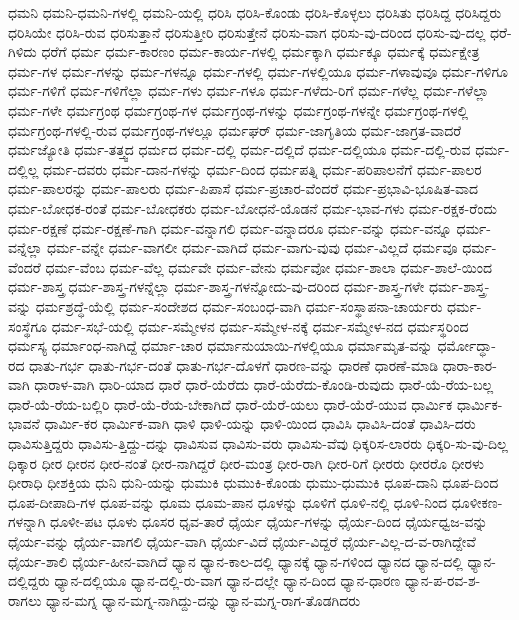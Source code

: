 {ಧಮನಿ
ಧಮನಿ-ಧಮನಿ-ಗಳಲ್ಲಿ
ಧಮನಿ-ಯಲ್ಲಿ
ಧರಿಸಿ
ಧರಿಸಿ-ಕೊಂಡು
ಧರಿಸಿ-ಕೊಳ್ಳಲು
ಧರಿಸಿತು
ಧರಿಸಿದ್ದ
ಧರಿಸಿದ್ದರು
ಧರಿಸಿಯೇ
ಧರಿಸಿ-ರುವ
ಧರಿಸುತ್ತಾನೆ
ಧರಿಸುತ್ತೀರಿ
ಧರಿಸುತ್ತೇನೆ
ಧರಿಸು-ವಾಗ
ಧರಿಸು-ವು-ದರಿಂದ
ಧರಿಸು-ವು-ದಲ್ಲ
ಧರೆ-ಗಿಳಿದು
ಧರೆಗೆ
ಧರ್ಮ
ಧರ್ಮ-ಕಾರಣಂ
ಧರ್ಮ-ಕಾರ್ಯ-ಗಳಲ್ಲಿ
ಧರ್ಮಕ್ಕಾಗಿ
ಧರ್ಮಕ್ಕೂ
ಧರ್ಮಕ್ಕೆ
ಧರ್ಮಕ್ಷೇತ್ರ
ಧರ್ಮ-ಗಳ
ಧರ್ಮ-ಗಳನ್ನು
ಧರ್ಮ-ಗಳನ್ನೂ
ಧರ್ಮ-ಗಳಲ್ಲಿ
ಧರ್ಮ-ಗಳಲ್ಲಿಯೂ
ಧರ್ಮ-ಗಳಾವುವೂ
ಧರ್ಮ-ಗಳಿಗೂ
ಧರ್ಮ-ಗಳಿಗೆ
ಧರ್ಮ-ಗಳಿಗೆಲ್ಲಾ
ಧರ್ಮ-ಗಳು
ಧರ್ಮ-ಗಳೂ
ಧರ್ಮ-ಗಳೆದು-ರಿಗೆ
ಧರ್ಮ-ಗಳೆಲ್ಲ
ಧರ್ಮ-ಗಳೆಲ್ಲಾ
ಧರ್ಮ-ಗಳೇ
ಧರ್ಮಗ್ರಂಥ
ಧರ್ಮಗ್ರಂಥ-ಗಳ
ಧರ್ಮಗ್ರಂಥ-ಗಳನ್ನು
ಧರ್ಮಗ್ರಂಥ-ಗಳನ್ನೇ
ಧರ್ಮಗ್ರಂಥ-ಗಳಲ್ಲಿ
ಧರ್ಮಗ್ರಂಥ-ಗಳಲ್ಲಿ-ರುವ
ಧರ್ಮಗ್ರಂಥ-ಗಳಲ್ಲೂ
ಧರ್ಮಘರ್
ಧರ್ಮ-ಜಾಗೃತಿಯ
ಧರ್ಮ-ಜಾಗ್ರತ-ವಾದರೆ
ಧರ್ಮಜ್ಯೋತಿ
ಧರ್ಮ-ತತ್ತ್ವದ
ಧರ್ಮದ
ಧರ್ಮ-ದಲ್ಲಿ
ಧರ್ಮ-ದಲ್ಲಿದೆ
ಧರ್ಮ-ದಲ್ಲಿಯೂ
ಧರ್ಮ-ದಲ್ಲಿ-ರುವ
ಧರ್ಮ-ದಲ್ಲಿಲ್ಲ
ಧರ್ಮ-ದವರು
ಧರ್ಮ-ದಾನ-ಗಳನ್ನು
ಧರ್ಮ-ದಿಂದ
ಧರ್ಮಪತ್ನಿ
ಧರ್ಮ-ಪರಿಪಾಲನೆಗೆ
ಧರ್ಮ-ಪಾಲರ
ಧರ್ಮ-ಪಾಲರನ್ನು
ಧರ್ಮ-ಪಾಲರು
ಧರ್ಮ-ಪಿಪಾಸೆ
ಧರ್ಮ-ಪ್ರಚಾರ-ವೆಂದರೆ
ಧರ್ಮ-ಪ್ರಭಾವಿ-ಭೂಷಿತ-ವಾದ
ಧರ್ಮ-ಬೋಧಕ-ರಂತೆ
ಧರ್ಮ-ಬೋಧಕರು
ಧರ್ಮ-ಬೋಧನೆ-ಯೊಡನೆ
ಧರ್ಮ-ಭಾವ-ಗಳು
ಧರ್ಮ-ರಕ್ಷಕ-ರೆಂದು
ಧರ್ಮ-ರಕ್ಷಣೆ
ಧರ್ಮ-ರಕ್ಷಣೆ-ಗಾಗಿ
ಧರ್ಮ-ವನ್ನಾಗಲಿ
ಧರ್ಮ-ವನ್ನಾದರೂ
ಧರ್ಮ-ವನ್ನು
ಧರ್ಮ-ವನ್ನೂ
ಧರ್ಮ-ವನ್ನೆಲ್ಲಾ
ಧರ್ಮ-ವನ್ನೇ
ಧರ್ಮ-ವಾಗಲೀ
ಧರ್ಮ-ವಾಗಿದೆ
ಧರ್ಮ-ವಾಗು-ವುವು
ಧರ್ಮ-ವಿಲ್ಲದೆ
ಧರ್ಮವೂ
ಧರ್ಮ-ವೆಂದರೆ
ಧರ್ಮ-ವೆಂಬ
ಧರ್ಮ-ವೆಲ್ಲ
ಧರ್ಮವೇ
ಧರ್ಮ-ವೇನು
ಧರ್ಮವೋ
ಧರ್ಮ-ಶಾಲಾ
ಧರ್ಮ-ಶಾಲೆ-ಯಿಂದ
ಧರ್ಮ-ಶಾಸ್ತ್ರ
ಧರ್ಮ-ಶಾಸ್ತ್ರ-ಗಳನ್ನೆಲ್ಲಾ
ಧರ್ಮ-ಶಾಸ್ತ್ರ-ಗಳನ್ನೋದು-ವು-ದರಿಂದ
ಧರ್ಮ-ಶಾಸ್ತ್ರ-ಗಳೇ
ಧರ್ಮ-ಶಾಸ್ತ್ರ-ವನ್ನು
ಧರ್ಮಶ್ರದ್ಧೆ-ಯೆಲ್ಲಿ
ಧರ್ಮ-ಸಂದೇಶದ
ಧರ್ಮ-ಸಂಬಂಧ-ವಾಗಿ
ಧರ್ಮ-ಸಂಸ್ಥಾಪನಾ-ಚಾರ್ಯರು
ಧರ್ಮ-ಸಂಸ್ಥೆಗೂ
ಧರ್ಮ-ಸಭೆ-ಯಲ್ಲಿ
ಧರ್ಮ-ಸಮ್ಮೇಳನ
ಧರ್ಮ-ಸಮ್ಮೇಳ-ನಕ್ಕೆ
ಧರ್ಮ-ಸಮ್ಮೇಳ-ನದ
ಧರ್ಮಸ್ಥರಿಂದ
ಧರ್ಮಸ್ಯ
ಧರ್ಮಾಂಧ-ನಾಗಿದ್ದೆ
ಧರ್ಮಾ-ಚಾರ
ಧರ್ಮಾನುಯಾಯಿ-ಗಳಲ್ಲಿಯೂ
ಧರ್ಮಾಮೃತ-ವನ್ನು
ಧರ್ಮೋದ್ಧಾ-ರದ
ಧಾತು-ಗರ್ಭ
ಧಾತು-ಗರ್ಭ-ದಂತೆ
ಧಾತು-ಗರ್ಭ-ದೊಳಗೆ
ಧಾರಣ-ವನ್ನು
ಧಾರಣೆ
ಧಾರಣೆ-ಮಾಡಿ
ಧಾರಾ-ಕಾರ-ವಾಗಿ
ಧಾರಾಳ-ವಾಗಿ
ಧಾರಿ-ಯಾದ
ಧಾರೆ
ಧಾರೆ-ಯೆರೆದು
ಧಾರೆ-ಯೆರೆದು-ಕೊಂಡಿ-ರುವುದು
ಧಾರೆ-ಯೆ-ರೆಯ-ಬಲ್ಲ
ಧಾರೆ-ಯೆ-ರೆಯ-ಬಲ್ಲಿರಿ
ಧಾರೆ-ಯೆ-ರೆಯ-ಬೇಕಾಗಿದೆ
ಧಾರೆ-ಯೆರೆ-ಯಲು
ಧಾರೆ-ಯೆರೆ-ಯುವ
ಧಾರ್ಮಿಕ
ಧಾರ್ಮಿಕ-ಭಾವನೆ
ಧಾರ್ಮಿ-ಕರ
ಧಾರ್ಮಿಕ-ವಾಗಿ
ಧಾಳಿ
ಧಾಳಿ-ಯನ್ನು
ಧಾಳಿ-ಯಿಂದ
ಧಾವಿಸಿ
ಧಾವಿಸಿ-ದಂತೆ
ಧಾವಿಸಿ-ದರು
ಧಾವಿಸುತ್ತಿದ್ದರು
ಧಾವಿಸು-ತ್ತಿದ್ದು-ದನ್ನು
ಧಾವಿಸುವ
ಧಾವಿಸು-ವರು
ಧಾವಿಸು-ವೆವು
ಧಿಕ್ಕರಿಸ-ಲಾರರು
ಧಿಕ್ಕರಿ-ಸು-ವು-ದಿಲ್ಲ
ಧಿಕ್ಕಾರ
ಧೀರ
ಧೀರನ
ಧೀರ-ನಂತೆ
ಧೀರ-ನಾಗಿದ್ದರೆ
ಧೀರ-ಮಂತ್ರ
ಧೀರ-ರಾಗಿ
ಧೀರ-ರಿಗೆ
ಧೀರರು
ಧೀರರೊ
ಧೀರಳು
ಧೀರಾಧಿ
ಧೀಶಕ್ತಿಯ
ಧುನಿ
ಧುನಿ-ಯನ್ನು
ಧುಮುಕಿ
ಧುಮುಕಿ-ಕೊಂಡು
ಧುಮು-ಧುಮುಕಿ
ಧೂಪ-ದಾನಿ
ಧೂಪ-ದಿಂದ
ಧೂಪ-ದೀಪಾದಿ-ಗಳ
ಧೂಪ-ವನ್ನು
ಧೂಮ
ಧೂಮ-ಪಾನ
ಧೂಳನ್ನು
ಧೂಳಿಗೆ
ಧೂಳಿ-ನಲ್ಲಿ
ಧೂಳಿ-ನಿಂದ
ಧೂಳೀಕಣ-ಗಳನ್ನಾಗಿ
ಧೂಳೀ-ಪಟ
ಧೂಳು
ಧೂಸರ
ಧೃವ-ತಾರೆ
ಧೈರ್ಯ
ಧೈರ್ಯ-ಗಳನ್ನು
ಧೈರ್ಯ-ದಿಂದ
ಧೈರ್ಯಧ್ವಜ-ವನ್ನು
ಧೈರ್ಯ-ವನ್ನು
ಧೈರ್ಯ-ವಾಗಲಿ
ಧೈರ್ಯ-ವಾಗಿ
ಧೈರ್ಯ-ವಿದೆ
ಧೈರ್ಯ-ವಿದ್ದರೆ
ಧೈರ್ಯ-ವಿಲ್ಲ-ದ-ವ-ರಾಗಿದ್ದೇವೆ
ಧೈರ್ಯ-ಶಾಲಿ
ಧೈರ್ಯ-ಹೀನ-ವಾಗಿದೆ
ಧ್ಯಾನ
ಧ್ಯಾನ-ಕಾಲ-ದಲ್ಲಿ
ಧ್ಯಾನಕ್ಕೆ
ಧ್ಯಾನ-ಗಳಿಂದ
ಧ್ಯಾನದ
ಧ್ಯಾನ-ದಲ್ಲಿ
ಧ್ಯಾನ-ದಲ್ಲಿದ್ದರು
ಧ್ಯಾನ-ದಲ್ಲಿಯೂ
ಧ್ಯಾನ-ದಲ್ಲಿ-ರು-ವಾಗ
ಧ್ಯಾನ-ದಲ್ಲೇ
ಧ್ಯಾನ-ದಿಂದ
ಧ್ಯಾನ-ಧಾರಣ
ಧ್ಯಾನ-ಪ-ರವ-ಶ-ರಾಗಲು
ಧ್ಯಾನ-ಮಗ್ನ
ಧ್ಯಾನ-ಮಗ್ನ-ನಾಗಿದ್ದು-ದನ್ನು
ಧ್ಯಾನ-ಮಗ್ನ-ರಾಗ-ತೊಡಗಿದರು
}
